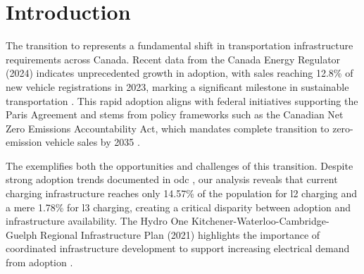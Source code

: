 \chapter{Introduction}

The transition to  represents a fundamental shift in transportation infrastructure requirements across Canada. Recent data from the Canada Energy Regulator (2024) indicates unprecedented growth in  adoption, with sales reaching 12.8\% of new vehicle registrations in 2023, marking a significant milestone in sustainable transportation \cite{cer_market_2024}. This rapid adoption aligns with federal initiatives supporting the Paris Agreement and stems from policy frameworks such as the Canadian Net Zero Emissions Accountability Act, which mandates complete transition to zero-emission vehicle sales by 2035 \cite{ecc_what_2024}.

The  exemplifies both the opportunities and challenges of this transition. Despite strong  adoption trends documented in \gls{odc} \cite{ontario_data_2024}, our analysis reveals that current charging infrastructure reaches only 14.57\% of the population for \gls{l2} charging and a mere 1.78\% for \gls{l3} charging, creating a critical disparity between  adoption and infrastructure availability. The Hydro One Kitchener-Waterloo-Cambridge-Guelph Regional Infrastructure Plan (2021) highlights the importance of coordinated infrastructure development to support increasing electrical demand from  adoption \cite{hydro_kwcg_2021} \cite{hydro_kwcg_2024}.


